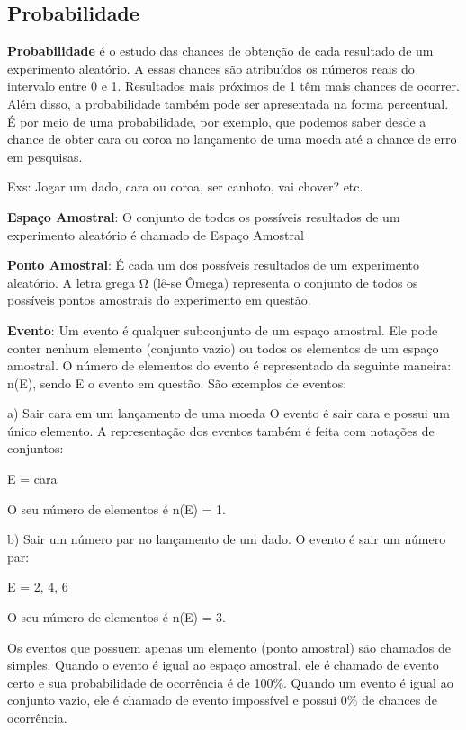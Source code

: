 \begin{multicols*}{2}
	
	\pagebreak
	\section{Probabilidade}

	\textbf{Probabilidade} é o estudo das chances de obtenção de cada resultado de um experimento aleatório. A essas chances são atribuídos os números reais do intervalo entre 0 e 1. Resultados mais próximos de 1 têm mais chances de ocorrer. Além disso, a probabilidade também pode ser apresentada na forma percentual. É por meio de uma probabilidade, por exemplo, que podemos saber desde a chance de obter cara ou coroa no lançamento de uma moeda até a chance de erro em pesquisas.

	Exs: Jogar um dado, cara ou coroa, ser canhoto, vai chover? etc.

	\textbf{Espaço Amostral}: O conjunto de todos os possíveis resultados de um experimento aleatório é chamado de Espaço Amostral

	\textbf{Ponto Amostral}: É cada um dos possíveis resultados de um experimento aleatório.
	A letra grega Ω (lê-se Ômega) representa o conjunto de todos os possíveis pontos amostrais do experimento em questão.

	\textbf{Evento}: Um evento é qualquer subconjunto de um espaço amostral. Ele pode conter nenhum elemento (conjunto vazio) ou todos os elementos de um espaço amostral. O número de elementos do evento é representado da seguinte maneira: n(E), sendo E o evento em questão. São exemplos de eventos:

	a) Sair cara em um lançamento de uma moeda O evento é sair cara e possui um único elemento. A representação dos eventos também é feita com notações de conjuntos:

	E = {cara}

	O seu número de elementos é n(E) = 1.

	b) Sair um número par no lançamento de um dado. O evento é sair um número par:

	E = {2, 4, 6}

	O seu número de elementos é n(E) = 3.

	Os eventos que possuem apenas um elemento (ponto amostral) são chamados de simples. Quando o evento é igual ao espaço amostral, ele é chamado de evento certo e sua probabilidade de ocorrência é de 100\%. Quando um evento é igual ao conjunto vazio, ele é chamado de evento impossível e possui 0\% de chances de ocorrência.


\end{multicols*}
